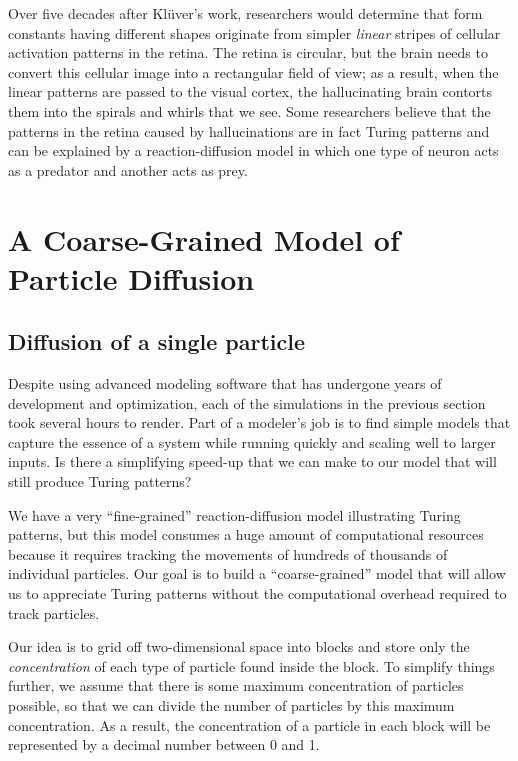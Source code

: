 Over five decades after Klüver's work, researchers would determine that form constants having different shapes originate from simpler \textit{linear} stripes of cellular activation patterns in the retina. The retina is circular, but the brain needs to convert this cellular image into a rectangular field of view; as a result, when the linear patterns are passed to the visual cortex, the hallucinating brain contorts them into the spirals and whirls that we see. Some researchers believe that the patterns in the retina caused by hallucinations are in fact Turing patterns and can be explained by a reaction-diffusion model in which one type of neuron acts as a predator and another acts as prey.\\

\FloatBarrier
{}
\section{A Coarse-Grained Model of Particle Diffusion}
\label{sec:coarse_grained_diffusion}

\subsection{Diffusion of a single particle}

Despite using advanced modeling software that has undergone years of development and optimization, each of the simulations in the previous section took several hours to render. Part of a modeler's job is to find simple models that capture the essence of a system while running quickly and scaling well to larger inputs. Is there a simplifying speed-up that we can make to our model that will still produce Turing patterns?

We have a very ``fine-grained'' reaction-diffusion model illustrating Turing patterns, but this model consumes a huge amount of computational resources because it requires tracking the movements of hundreds of thousands of individual particles. Our goal is to build a ``coarse-grained'' model that will allow us to appreciate Turing patterns without the computational overhead required to track particles.

Our idea is to grid off two-dimensional space into blocks and store only the \textit{concentration} of each type of particle found inside the block. To simplify things further, we assume that there is some maximum concentration of particles possible, so that we can divide the number of particles by this maximum concentration. As a result, the concentration of a particle in each block will be represented by a decimal number between 0 and 1.

